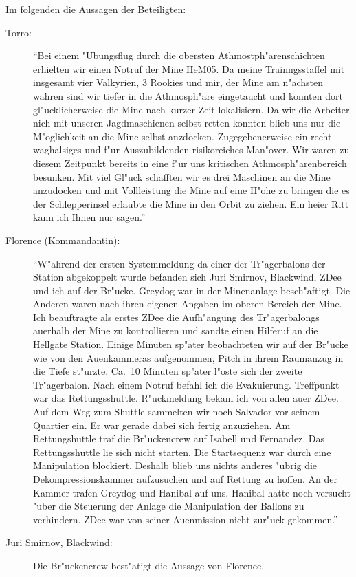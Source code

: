 Im folgenden die Aussagen der Beteiligten:

\begin{description}
	\item[Torro:] "`Bei einem "Ubungsflug durch die obersten Athmostph"arenschichten erhielten wir einen Notruf der Mine HeM05. Da meine Trainngsstaffel mit insgesamt vier Valkyrien, 3 Rookies und mir, der Mine am n"achsten wahren sind wir tiefer in die Athmosph"are eingetaucht und konnten dort gl"ucklicherweise die Mine nach kurzer Zeit lokalisiern. Da wir die Arbeiter nich mit unseren Jagdmaschienen selbst retten konnten blieb uns nur die M"oglichkeit an die Mine selbst anzdocken. Zugegebenerweise ein recht waghalsiges und f"ur Auszubildenden risikoreiches Man"over. Wir waren zu diesem Zeitpunkt bereits in eine f"ur uns kritischen Athmosph"arenbereich besunken. Mit viel Gl"uck schafften wir es drei Maschinen an die Mine anzudocken und mit Vollleistung die Mine auf eine H"ohe zu bringen die es der Schlepperinsel erlaubte die Mine in den Orbit zu ziehen. Ein hei\3er Ritt kann ich Ihnen nur sagen."'
	\item[Florence (Kommandantin):] "`W"ahrend der ersten Systemmeldung da\3 einer der Tr"agerbalons der Station abgekoppelt wurde befanden sich Juri Smirnov, Blackwind, ZDee und ich auf der Br"ucke. Greydog war in der Minenanlage besch"aftigt. Die Anderen waren nach ihren eigenen Angaben im oberen Bereich der Mine. Ich beauftragte als erstes ZDee die Aufh"angung des Tr"agerbalongs au\3erhalb der Mine zu kontrollieren und sandte einen Hilferuf an die Hellgate Station. Einige Minuten sp"ater beobachteten wir auf der Br"ucke wie von den Au\3enkammeras aufgenommen, Pitch in ihrem Raumanzug in die Tiefe st"urzte. Ca.~10 Minuten sp"ater l"oste sich der zweite Tr"agerbalon. Nach einem Notruf befahl ich die Evakuierung. Treffpunkt war das Rettungsshuttle. R"uckmeldung bekam ich von allen au\3er ZDee. Auf dem Weg zum Shuttle sammelten wir noch Salvador vor seinem Quartier ein. Er war gerade dabei sich fertig anzuziehen. Am Rettungshuttle traf die Br"uckencrew auf Isabell und Fernandez. Das Rettungsshuttle lie\3 sich nicht starten. Die Startsequenz war durch eine Manipulation blockiert. Deshalb blieb uns nichts anderes "ubrig die Dekompressionskammer aufzusuchen und auf Rettung zu hoffen. An der Kammer trafen Greydog und Hanibal auf uns. Hanibal hatte noch versucht "uber die Steuerung der Anlage die Manipulation der Ballons zu verhindern. ZDee war von seiner Au\3enmission nicht zur"uck gekommen."'
	\item[Juri Smirnov, Blackwind:] Die Br"uckencrew best"atigt die Aussage von Florence.

\end{description}
